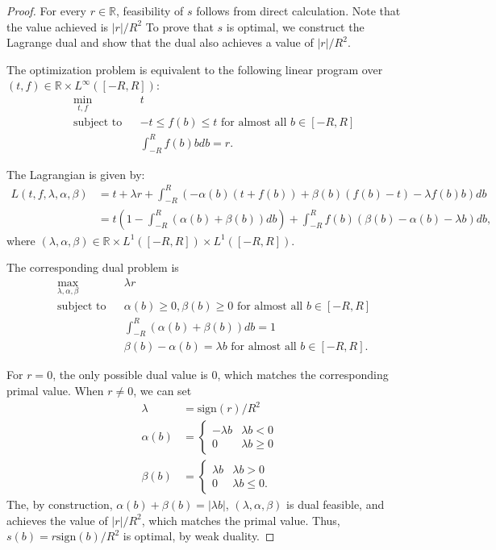 \documentclass[twoside]{article}
\theoremstyle{definition}
\newcommand{\R}{\mathbb{R}}
\newcommand{\sign}{\mathrm{sign}}
\newcommand{\1}[1]{\scalebox{1.25}{$\mathds{1}$}\left[#1\right]}
\begin{document}
\begin{proof}
For every $r\in\R$, feasibility of $s$ follows from direct calculation. Note that the value achieved is $|r|/R^2$ To prove that $s$ is optimal, we construct the Lagrange dual and show that the dual also achieves a value of $|r|/R^2$.

The optimization problem is equivalent to the following linear program over $(t,f)\in \R\times L^{\infty}([-R,R])$:
\begin{align*}
& \min_{t,f} && t \\
&\textrm{subject to} && -t \le f(b) \le t \textrm{ for almost all } b\in [-R,R]\\
&&& \int_{-R}^Rf(b)b db = r.
\end{align*}

The Lagrangian is given by:
\begin{align*}
L(t,f,\lambda,\alpha,\beta)&=t+\lambda r+\int_{-R}^{R}\left(-\alpha(b)(t+f(b))+\beta(b)(f(b)-t)-\lambda f(b)b\right)db\\
&=t\left(1-\int_{-R}^{R}(\alpha(b)+\beta(b))db\right)+\int_{-R}^{R}f(b)\left(\beta(b)-\alpha(b)-\lambda b \right)db,
\end{align*}
where $(\lambda,\alpha,\beta)\in \R\times L^1([-R,R])\times L^1([-R,R]).$

The corresponding dual problem is 
\begin{align*}
& \max_{\lambda,\alpha,\beta} && \lambda r \\
&\textrm{subject to} && \alpha(b)\ge 0, \beta(b)\ge 0 \textrm{ for almost all } b\in [-R,R] \\
&&& \int_{-R}^R(\alpha(b)+\beta(b))db = 1 \\
&&& \beta(b)-\alpha(b)=\lambda b \textrm{ for almost all } b\in [-R,R].
\end{align*}

For $r=0$, the only possible dual value is $0$, which matches the corresponding primal value. When $r\ne 0$, we can set
\begin{align*}
\lambda &= \sign(r)/R^2 \\
\alpha(b) &= \begin{cases}
-\lambda b & \lambda b < 0 \\
0 & \lambda b \ge 0 
\end{cases} \\
\beta(b) &= \begin{cases}
\lambda b & \lambda b > 0 \\
0 & \lambda b \le 0.
\end{cases}
\end{align*}
The, by construction, $\alpha(b)+\beta(b)=|\lambda b|$, $(\lambda,\alpha,\beta)$ is dual feasible, and achieves the value of $|r|/R^2$, which matches the primal value. Thus, $s(b)=r\sign(b)/R^2$ is optimal, by  weak duality. 
\end{proof}
\end{document}
